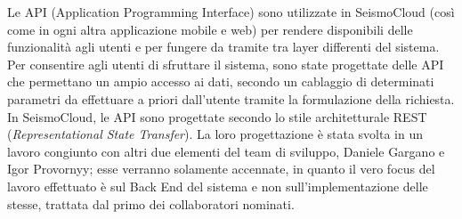 Le API (Application Programming Interface) sono utilizzate in SeismoCloud (così come in ogni altra applicazione mobile e web) per rendere disponibili delle funzionalità agli utenti e per fungere da tramite tra layer differenti del sistema. Per consentire agli utenti di sfruttare il sistema, sono state progettate delle API che permettano un ampio accesso ai dati, secondo un cablaggio di determinati parametri da effettuare a priori dall'utente tramite la formulazione della richiesta. In SeismoCloud, le API sono progettate secondo lo stile architetturale REST (\textit{Representational State Transfer}). La loro progettazione è stata svolta in un lavoro congiunto con altri due elementi del team di sviluppo, Daniele Gargano e Igor Provornyy; esse verranno solamente accennate, in quanto il vero focus del lavoro effettuato è sul Back End del sistema e non sull'implementazione delle stesse, trattata dal primo dei collaboratori nominati.

